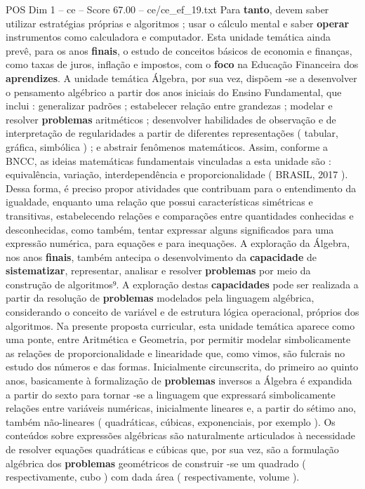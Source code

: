\begin{textsample}{POS Dim 1 – ce – Score 67.00 – ce/ce\_ef\_19.txt}
Para \textbf{tanto}, devem saber utilizar estratégias próprias e algoritmos ; usar o cálculo mental e saber \textbf{operar} instrumentos como calculadora e computador.
Esta unidade temática ainda prevê, para os anos \textbf{finais}, o estudo de conceitos básicos de economia e finanças, como taxas de juros, inflação e impostos, com o \textbf{foco} na Educação Financeira dos \textbf{aprendizes}.
A unidade temática Álgebra, por sua vez, dispõem -se a desenvolver o pensamento algébrico a partir dos anos iniciais do Ensino Fundamental, que inclui : generalizar padrões ; estabelecer relação entre grandezas ; modelar e resolver \textbf{problemas} aritméticos ; desenvolver habilidades de observação e de interpretação de regularidades a partir de diferentes representações ( tabular, gráfica, simbólica ) ; e abstrair fenômenos matemáticos.
Assim, conforme a BNCC, as ideias matemáticas fundamentais vinculadas a esta unidade são : equivalência, variação, interdependência e proporcionalidade ( BRASIL, 2017 ).
Dessa forma, é preciso propor atividades que contribuam para o entendimento da igualdade, enquanto uma relação que possui características simétricas e transitivas, estabelecendo relações e comparações entre quantidades conhecidas e desconhecidas, como também, tentar expressar alguns significados para uma expressão numérica, para equações e para inequações.
A exploração da Álgebra, nos anos \textbf{finais}, também antecipa o desenvolvimento da \textbf{capacidade} de \textbf{sistematizar}, representar, analisar e resolver \textbf{problemas} por meio da construção de algoritmos⁹.
A exploração destas \textbf{capacidades} pode ser realizada a partir da resolução de \textbf{problemas} modelados pela linguagem algébrica, considerando o conceito de variável e de estrutura lógica operacional, próprios dos algoritmos.
Na presente proposta curricular, esta unidade temática aparece como uma ponte, entre Aritmética e Geometria, por permitir modelar simbolicamente as relações de proporcionalidade e linearidade que, como vimos, são fulcrais no estudo dos números e das formas.
Inicialmente circunscrita, do primeiro ao quinto anos, basicamente à formalização de \textbf{problemas} inversos a Álgebra é expandida a partir do sexto para tornar -se a linguagem que expressará simbolicamente relações entre variáveis numéricas, inicialmente lineares e, a partir do sétimo ano, também não-lineares ( quadráticas, cúbicas, exponenciais, por exemplo ).
Os conteúdos sobre expressões algébricas são naturalmente articulados à necessidade de resolver equações quadráticas e cúbicas que, por sua vez, são a formulação algébrica dos \textbf{problemas} geométricos de construir -se um quadrado ( respectivamente, cubo ) com dada área ( respectivamente, volume ).

\end{textsample}
